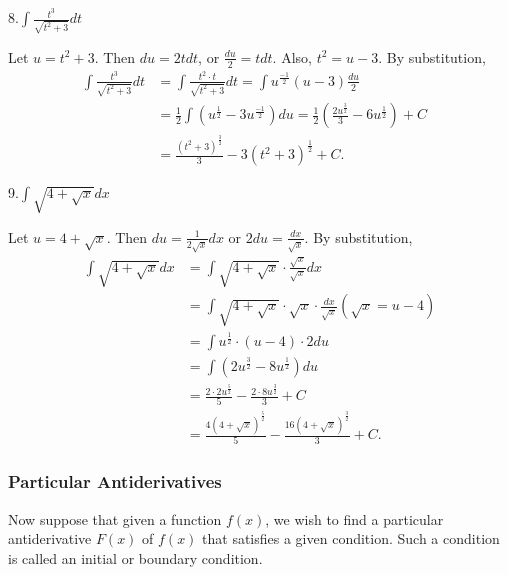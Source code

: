 \documentclass[
  letterpaper,
  DIV=11,
  numbers=noendperiod]{scrartcl}
\begin{document}
8.\(\int \frac{t^3}{\sqrt{t^2+3}}dt\)

Let \(u=t^2+3\). Then \(du=2tdt\), or \(\frac{du}{2}=tdt\). Also,
\(t^2=u-3\). By substitution, \[
\begin{aligned}
\int \frac{t^3}{\sqrt{t^2+3}}dt &= \int \frac{t^2\cdot{t}}{\sqrt {t^2+3}}dt=\int u^\frac{-1}{2}(u-3)\frac{du}{2}&\\&=\frac{1}{2}\int \left(u^\frac{1}{2}-3u^\frac{-1}{2}\right)du =\frac{1}{2} \left(\frac{2u^\frac{3}{2}}{3}-6u^\frac{1}{2}\right)+C \\& =\frac{\left(t^2+3\right)^\frac{3}{2}}{3}-3\left(t^2+3\right)^\frac{1}{2}+C.
\end{aligned}
\]

9.\(\int \sqrt{4+\sqrt x}dx\)

Let \(u=4+\sqrt x\). Then \(du=\frac{1}{2\sqrt x}dx\) or
\(2du=\frac{dx}{\sqrt x}\). By substitution, \[
\begin{aligned}
\int \sqrt{4+\sqrt x}dx&=\int \sqrt{4+\sqrt x} \cdot\frac{\sqrt x}{\sqrt x}dx\\&=\int \sqrt{4+\sqrt x} \cdot \sqrt x\cdot \frac{dx}{\sqrt x} (\sqrt x=u-4)\\&=\int u^\frac{1}{2}\cdot (u-4)\cdot 2du\\&=\int(2u^\frac{3}{2}-8u^\frac{1}{2}) du\\&=\frac{2\cdot2u^\frac{5}{2}}5-\frac{2\cdot 8u^\frac{3}{2}}{3}+C\\&=\frac{4\left (4+\sqrt x\right)^\frac{5}{2}}{5}-\frac{16\left(4+\sqrt x\right)^\frac{3}{2}}{3}+C.
\end{aligned}
\]

\hypertarget{htm:ParticularAntiderivatives}{}
\hypertarget{particular-antiderivatives}{%
\subsubsection{Particular
Antiderivatives}\label{particular-antiderivatives}}

Now suppose that given a function \(f(x)\), we wish to find a particular
antiderivative \(F(x)\) of \(f(x)\) that satisfies a given condition.
Such a condition is called an initial or boundary condition.
\end{document}
